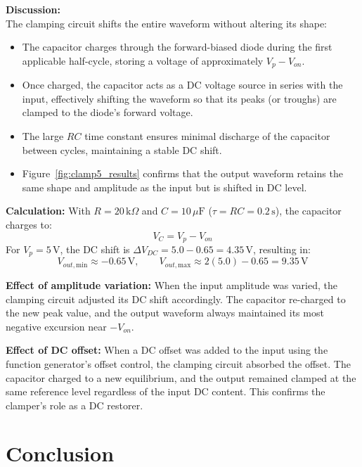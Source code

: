 \documentclass[12pt, letterpaper]{article}
\begin{document}
\textbf{Discussion:} \\
The clamping circuit shifts the entire waveform without altering its shape:
\begin{itemize}
	\item The capacitor charges through the forward-biased diode during the first applicable half-cycle, storing a voltage of approximately $V_p - V_{on}$.
	\item Once charged, the capacitor acts as a DC voltage source in series with the input, effectively shifting the waveform so that its peaks (or troughs) are clamped to the diode's forward voltage.
	\item The large $RC$ time constant ensures minimal discharge of the capacitor between cycles, maintaining a stable DC shift.
	\item Figure~\ref{fig:clamp5_results} confirms that the output waveform retains the same shape and amplitude as the input but is shifted in DC level.
\end{itemize}

\textbf{Calculation:}
With $R = 20\,\text{k}\Omega$ and $C = 10\,\mu\text{F}$ ($\tau = RC = 0.2\,\text{s}$), the capacitor charges to:
\[
V_C = V_p - V_{on}
\]
For $V_p = 5\,\text{V}$, the DC shift is $\Delta V_{DC} = 5.0 - 0.65 = 4.35\,\text{V}$, resulting in:
\[
V_{out,\text{min}} \approx -0.65\,\text{V}, \qquad V_{out,\text{max}} \approx 2(5.0) - 0.65 = 9.35\,\text{V}
\]

\textbf{Effect of amplitude variation:} When the input amplitude was varied, the clamping circuit adjusted its DC shift accordingly. The capacitor re-charged to the new peak value, and the output waveform always maintained its most negative excursion near $-V_{on}$.

\textbf{Effect of DC offset:} When a DC offset was added to the input using the function generator's offset control, the clamping circuit absorbed the offset. The capacitor charged to a new equilibrium, and the output remained clamped at the same reference level regardless of the input DC content. This confirms the clamper's role as a DC restorer.

\section{Conclusion}
\end{document}

